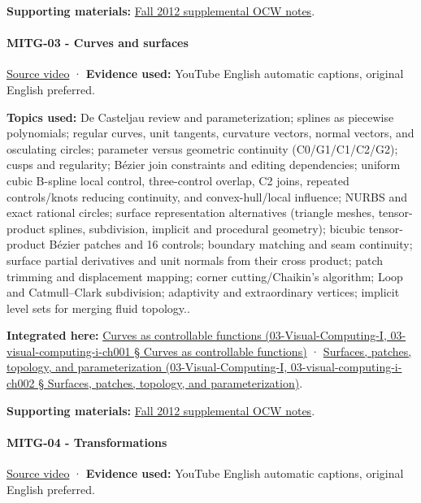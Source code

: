 \textbf{Supporting materials:} \href{https://ocw.mit.edu/courses/6-837-computer-graphics-fall-2012/pages/lecture-notes/}{Fall 2012 supplemental OCW notes}.

\paragraph{MITG-03 - Curves and surfaces}\label{mitg-03---curves-and-surfaces}

\href{https://www.youtube.com/watch?v=LzIjSdNoR9s}{Source video} · \textbf{Evidence used:} YouTube English automatic captions, original English preferred.

\textbf{Topics used:} De Casteljau review and parameterization; splines as piecewise polynomials; regular curves, unit tangents, curvature vectors, normal vectors, and osculating circles; parameter versus geometric continuity (C0/G1/C1/C2/G2); cusps and regularity; Bézier join constraints and editing dependencies; uniform cubic B-spline local control, three-control overlap, C2 joins, repeated controls/knots reducing continuity, and convex-hull/local influence; NURBS and exact rational circles; surface representation alternatives (triangle meshes, tensor-product splines, subdivision, implicit and procedural geometry); bicubic tensor-product Bézier patches and 16 controls; boundary matching and seam continuity; surface partial derivatives and unit normals from their cross product; patch trimming and displacement mapping; corner cutting/Chaikin's algorithm; Loop and Catmull--Clark subdivision; adaptivity and extraordinary vertices; implicit level sets for merging fluid topology..

\textbf{Integrated here:} \href{}{Curves as controllable functions (03-Visual-Computing-I, 03-visual-computing-i-ch001 § Curves as controllable functions)} · \href{}{Surfaces, patches, topology, and parameterization (03-Visual-Computing-I, 03-visual-computing-i-ch002 § Surfaces, patches, topology, and parameterization)}.

\textbf{Supporting materials:} \href{https://ocw.mit.edu/courses/6-837-computer-graphics-fall-2012/pages/lecture-notes/}{Fall 2012 supplemental OCW notes}.

\paragraph{MITG-04 - Transformations}\label{mitg-04---transformations}

\href{https://www.youtube.com/watch?v=WqmL_e7OGeU}{Source video} · \textbf{Evidence used:} YouTube English automatic captions, original English preferred.

